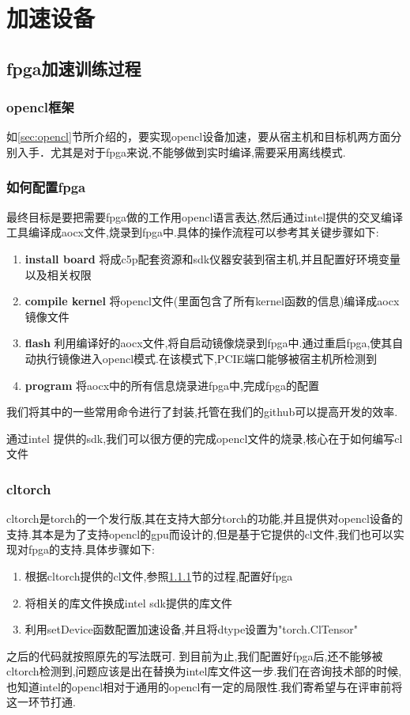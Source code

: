 \section{加速设备}
\subsection{fpga加速训练过程}
\subsubsection{opencl框架}\label{sec:opencl-step}
如\ref{sec:opencl}节所介绍的，要实现opencl设备加速，要从宿主机和目标机两方面分别入手．尤其是对于fpga来说,不能够做到实时编译,需要采用离线模式.
\subsubsection{如何配置fpga}
最终目标是要把需要fpga做的工作用opencl语言表达,然后通过intel提供的交叉编译工具编译成aocx文件,烧录到fpga中.具体的操作流程可以参考\cite{intel-opencl}其关键步骤如下:
\begin{enumerate}
  \item{\textbf{install board}} 将成c5p配套资源和sdk仪器安装到宿主机,并且配置好环境变量以及相关权限
  \item{\textbf{compile kernel}}  将opencl文件(里面包含了所有kernel函数的信息)编译成aocx镜像文件
  \item{\textbf{flash}} 利用编译好的aocx文件,将自启动镜像烧录到fpga中.通过重启fpga,使其自动执行镜像进入opencl模式.在该模式下,PCIE端口能够被宿主机所检测到
  \item{\textbf{program}} 将aocx中的所有信息烧录进fpga中,完成fpga的配置
\end{enumerate}

我们将其中的一些常用命令进行了封装,托管在我们的github\cite{rcClub}可以提高开发的效率.

通过intel 提供的sdk,我们可以很方便的完成opencl文件的烧录,核心在于如何编写cl文件
\subsubsection{cltorch}
cltorch是torch的一个发行版,其在支持大部分torch的功能,并且提供对opencl设备的支持.其本是为了支持opencl的gpu而设计的,但是基于它提供的cl文件,我们也可以实现对fpga的支持.具体步骤如下:
\begin{enumerate}
  \item 根据cltorch提供的cl文件,参照\ref{sec:opencl-step}节的过程,配置好fpga
  \item 将相关的库文件换成intel sdk提供的库文件
  \item 利用setDevice函数配置加速设备,并且将dtype设置为"torch.ClTensor"
\end{enumerate}
之后的代码就按照原先的写法既可.
到目前为止,我们配置好fpga后,还不能够被cltorch检测到,问题应该是出在替换为intel库文件这一步.我们在咨询技术部的时候,也知道intel的opencl相对于通用的opencl有一定的局限性.我们寄希望与在评审前将这一环节打通.
